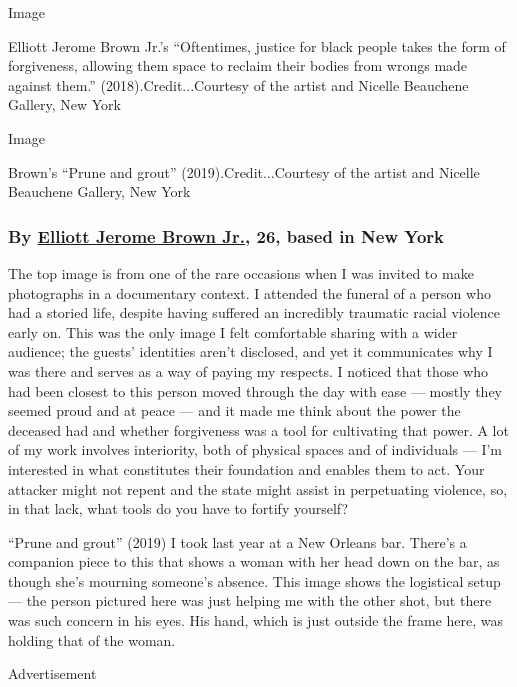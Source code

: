 Image

Elliott Jerome Brown Jr.'s ``Oftentimes, justice for black people takes
the form of forgiveness, allowing them space to reclaim their bodies
from wrongs made against them.'' (2018).Credit...Courtesy of the artist
and Nicelle Beauchene Gallery, New York

Image

Brown's ``Prune and grout'' (2019).Credit...Courtesy of the artist and
Nicelle Beauchene Gallery, New York

\hypertarget{by-elliott-jerome-brown-jr-26-based-in-new-york}{%
\subsubsection{\texorpdfstring{\textbf{By}
\textbf{\href{https://elliottjeromebrownjr.com/}{Elliott Jerome Brown
Jr.}, 26, based in New
York}}{By Elliott Jerome Brown Jr., 26, based in New York}}\label{by-elliott-jerome-brown-jr-26-based-in-new-york}}

The top image is from one of the rare occasions when I was invited to
make photographs in a documentary context. I attended the funeral of a
person who had a storied life, despite having suffered an incredibly
traumatic racial violence early on. This was the only image I felt
comfortable sharing with a wider audience; the guests' identities aren't
disclosed, and yet it communicates why I was there and serves as a way
of paying my respects. I noticed that those who had been closest to this
person moved through the day with ease --- mostly they seemed proud and
at peace --- and it made me think about the power the deceased had and
whether forgiveness was a tool for cultivating that power. A lot of my
work involves interiority, both of physical spaces and of individuals
--- I'm interested in what constitutes their foundation and enables them
to act. Your attacker might not repent and the state might assist in
perpetuating violence, so, in that lack, what tools do you have to
fortify yourself?

``Prune and grout'' (2019) I took last year at a New Orleans bar.
There's a companion piece to this that shows a woman with her head down
on the bar, as though she's mourning someone's absence. This image shows
the logistical setup --- the person pictured here was just helping me
with the other shot, but there was such concern in his eyes. His hand,
which is just outside the frame here, was holding that of the woman.

Advertisement

